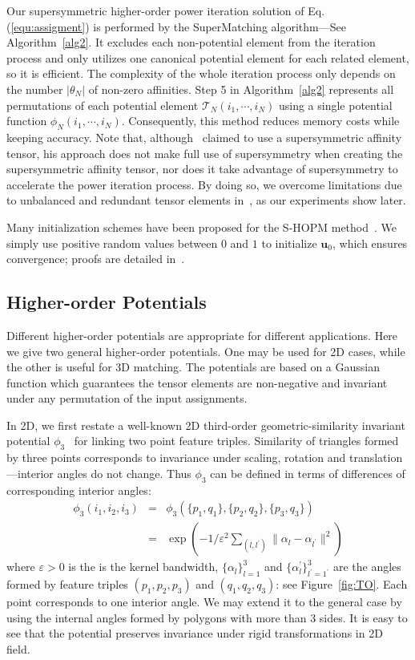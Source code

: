 Our supersymmetric higher-order power iteration solution of Eq. (\ref{equ:assigment}) is performed by the SuperMatching algorithm---See Algorithm~\ref{alg2}.
It excludes each non-potential element from the iteration process and only utilizes one canonical potential element for each related element, so it is efficient.
The complexity of the whole iteration process only depends on the number $|\theta_N|$ of non-zero affinities. Step 5 in Algorithm~\ref{alg2} represents all permutations of each potential element $\mathcal{T}_N(i_1,\cdots,i_N)$
using a single potential function $\phi_N(i_1,\cdots,i_N)$.
Consequently, this method reduces memory costs while keeping accuracy.
Note that, although~\cite{Duchenne09} claimed to use a supersymmetric affinity tensor,
his approach does not make full use of supersymmetry when creating the supersymmetric affinity tensor,
nor does it take advantage of supersymmetry to accelerate the power iteration process.
By doing so, we overcome limitations due to unbalanced and redundant tensor elements in~\cite{Duchenne09}, as our experiments show later.

Many initialization schemes have been proposed for the S-HOPM method~\cite{Kofidis02}.
We simply use positive random values between $0$ and $1$ to initialize $\boldsymbol{u}_0$, which ensures convergence; proofs are detailed in~\cite{Regalia00,Kofidis02}.

\subsection{Higher-order Potentials}
\label{subsec:potentials}

Different higher-order potentials are appropriate for different applications.
Here we give two general higher-order potentials.
One may be used for  2D cases, while the other is useful for 3D matching.
The potentials are based on a Gaussian function
which guarantees the tensor elements are non-negative and invariant under any permutation of the input assignments.

In 2D, we first restate a well-known 2D third-order geometric-similarity invariant potential $\phi_3$~\cite{Duchenne09,Chertok10} for linking two point feature triples.
Similarity of triangles formed by three points corresponds to invariance under scaling, rotation and translation---interior angles do not change.
Thus $\phi_3$ can be defined in terms of differences of corresponding interior angles:
\begin{eqnarray}
\phi_3(i_1,i_2,i_3)&=&\phi_3(\{p_1,q_1\}, \{p_2,q_2\}, \{p_3,q_3\})\nonumber\\
&=&\exp(-1/\varepsilon^2\sum\nolimits_{(l,l^{'})}\lVert \alpha_l- \alpha_{l^{'} } \lVert^2 )
\end{eqnarray}
where $\varepsilon > 0$ is the is the kernel bandwidth,
$\{\alpha_l\}_{l=1}^3$ and $\{\alpha_l^{'}\}_{l^{'}=1^{'}}^{3}$ are the angles formed by feature triples $(p_1,p_2,p_3)$ and $(q_1,q_2,q_3)$:
see Figure~\ref{fig:TO}. Each point corresponds to one interior angle.
We may extend it to the general case by using the internal angles formed by  polygons with more than 3 sides.
It is easy to see that the potential preserves invariance under rigid transformations in 2D field.

